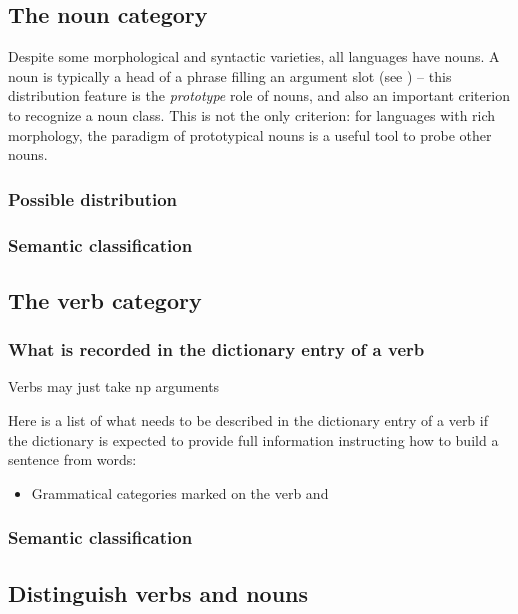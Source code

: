 \documentclass[UTF8, a4paper, oneside, scheme=plain]{ctexart}
\begin{document}
\subsection{The noun category}

Despite some morphological and syntactic varieties, 
all languages have nouns. 
A noun is typically a head of a phrase filling an argument slot (see )
-- this distribution feature is the \emph{prototype} role of nouns, 
and also an important criterion to recognize a noun class.
This is not the only criterion:
for languages with rich morphology, 
the paradigm of prototypical nouns is a useful tool to probe other nouns.

\subsubsection{Possible distribution}



\subsubsection{Semantic classification}

\subsection{The verb category}

\subsubsection{What is recorded in the dictionary entry of a verb}

Verbs may just take \ac{np} arguments

Here is a list of what needs to be described in the dictionary entry of a verb
if the dictionary is expected to provide full information instructing 
how to build a sentence from words:
\begin{itemize}
    \item Grammatical categories marked on the verb and 
\end{itemize}

\subsubsection{Semantic classification}

\subsection{Distinguish verbs and nouns}
\end{document}
